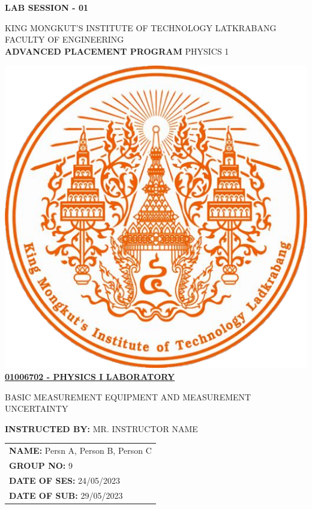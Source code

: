 \def\SESSION { LAB SESSION - 01 }
\def\TITLE {
	KING MONGKUT'S INSTITUTE OF TECHNOLOGY LATKRABANG\\
	FACULTY OF ENGINEERING\\
	\textbf{ADVANCED PLACEMENT PROGRAM} PHYSICS 1
}
\def\SUBTITLE {
	BASIC MEASUREMENT EQUIPMENT AND MEASUREMENT\\
	UNCERTAINTY\\
}
\def\SUBJECT {
	01006702 - PHYSICS I LABORATORY
}
\def\INSTRUCTOR {
	MR. INSTRUCTOR NAME
}
\def\SUBMISSION {
	\textbf{NAME:} Persn A, Person B, Person C\\
	\textbf{GROUP NO:} 9\\
	\textbf{DATE OF SES:} 24/05/2023\\
	\textbf{DATE OF SUB:} 29/05/2023\\
}

\begin{center}
	\vspace{-80pt}\hfill\textbf{\SESSION}\\[1cm]
	\vspace{5pt}
	\begin{minipage}[t][1.35in][t]{\textwidth}
		\begin{center}
			\TITLE
		\end{center}
	\end{minipage}
	\includegraphics[scale=0.34]{assets/Ladkrabang.png}\\[60pt]
	\underline{\textbf{\SUBJECT}}\\
	\vspace{15pt}
	\SUBTITLE
\end{center}
\vfill
\textbf{INSTRUCTED BY:} \INSTRUCTOR\\[40pt]
\null\hfill
\begin{tabular}{ l }
	\SUBMISSION
\end{tabular}
